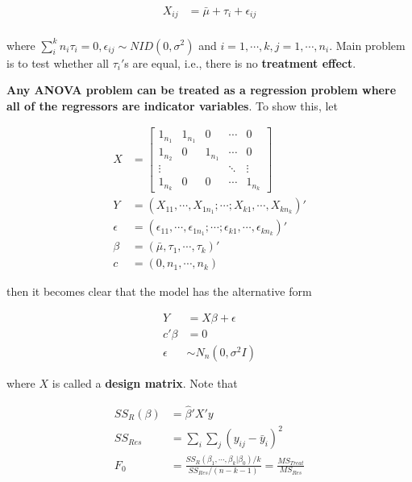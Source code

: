 \documentclass[12pt]{article}
\begin{document}
$$
\begin{aligned}
X_{ij} &= \bar{\mu} + \tau_i + \epsilon_{ij} \\[10pt]
\end{aligned}
$$

where $\sum_i^k n_i \tau_i = 0, \epsilon_{ij} \sim NID(0, \sigma^2)$ and $i = 1, \cdots, k, j=1, \cdots, n_i$. Main problem is to test whether all $\tau_i'$s are equal, i.e., there is no \textbf{treatment effect}.

\textbf{Any ANOVA problem can be treated as a regression problem where all of the regressors are indicator variables}. To show this, let

$$
\begin{aligned}
X &= \begin{bmatrix} 1_{n_1} & 1_{n_1} & 0 & \cdots & 0 \\
					 1_{n_2} & 0 & 1_{n_1} & \cdots & 0 \\ 
					 \vdots  &   &         & \ddots & \vdots \\
					 1_{n_k} & 0 & 0       & \cdots & 1_{n_k} \end{bmatrix} \\[10pt]
Y &= \left(X_{11}, \cdots, X_{1n_1}; \cdots; X_{k1}, \cdots, X_{kn_k} \right)' \\[8pt]
\epsilon &= \left( \epsilon_{11}, \cdots, \epsilon_{1n_1}; \cdots; \epsilon_{k1}, \cdots, \epsilon_{kn_k} \right)' \\[8pt]
\beta &= \left( \bar{\mu}, \tau_1, \cdots, \tau_k \right)' \\[8pt]
c &= \left( 0, n_1, \cdots, n_k\right)
\end{aligned}
$$


then it becomes clear that the model has the alternative form

$$
\begin{aligned}
Y &= X\beta + \epsilon\\[8pt]
c' \beta &= 0 \\[8pt]
\epsilon &\sim N_n (0, \sigma^2 I)
\end{aligned}
$$

where $X$ is called a \textbf{design matrix}. Note that 

$$
\begin{aligned}
SS_R (\beta) &= \hat{\beta}' X' y \\[8pt]
SS_{Res} &= \sum_i \sum_j (y_{ij} - \bar{y}_i)^2 \\[8pt]
F_0 &= \frac{SS_R(\beta_1, \cdots, \beta_k | \beta_0)/k}{SS_{Res}/(n-k-1)} = \frac{MS_{Treat}}{MS_{Res}}
\end{aligned}
$$
\end{document}
